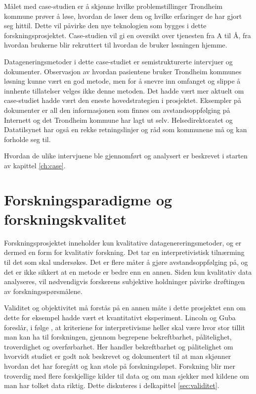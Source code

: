 Målet med case-studien er å skjønne hvilke problemstillinger Trondheim kommune prøver å løse, hvordan de løser dem og hvilke
erfaringer de har gjort seg hittil. Dette vil påvirke den nye teknologien som bygges i dette forskningsprosjektet. Case-studien
vil gi en oversikt over tjenesten fra A til Å, fra hvordan brukerne blir rekruttert til hvordan de bruker løsningen hjemme.

Datageneringsmetoder i dette case-studiet er semistrukturerte intervjuer og dokumenter. Observasjon av hvordan pasientene bruker Trondheim kommunes løsning
kunne vært en god metode, men for å snevre inn omfanget og slippe å innhente tillatelser velges ikke denne metoden. Det hadde vært mer
aktuelt om case-studiet hadde vært den eneste hovedstrategien i prosjektet. Eksempler på dokumenter er all den informasjonen som finnes om
avstandsoppfølging på Internett og det Trondheim kommune har lagt ut selv. Helsedirektoratet og Datatilsynet
har også en rekke retningslinjer og råd som kommunene må og kan forholde seg til.

Hvordan de ulike intervjuene ble gjennomført og analysert er beskrevet i starten av kapittel \ref{ch:case}.

\section{Forskningsparadigme og forskningskvalitet}
Forskningsprosjektet inneholder kun kvalitative datagenereringsmetoder, og er dermed en form for kvalitativ forskning.
Det tar en interpretivistisk tilnærming til det som skal undersøkes. Det er flere måter å gjøre avstandsoppfølging på,
og det er ikke sikkert at en metode er bedre enn en annen.
Siden kun kvalitativ data analyseres, vil nødvendigvis forskerens subjektive holdninger påvirke drøftingen av forskningsspørsmålene.

Validitet og objektivitet må forstås på en annen måte i dette prosjektet enn om dette for eksempel hadde vært et
kvantitativt eksperiment. Lincoln og Guba foreslår, i følge \citet{oates},
at kriteriene for interpretivisme
heller skal være hvor stor tillit man kan ha til forskningen, gjennom begrepene bekreftbarhet, pålitelighet, troverdighet og overførbarhet.
Her handler bekreftbarhet og pålitelighet om hvorvidt studiet er godt nok beskrevet og dokumentert til at man skjønner hvordan det har
foregått og kan stole
på forskningsløpet. Forskning blir mer troverdig med flere forskjellige kilder til data og om man sjekker med kildene om man har
tolket data riktig. Dette diskuteres i delkapittel \ref{sec:validitet}.
